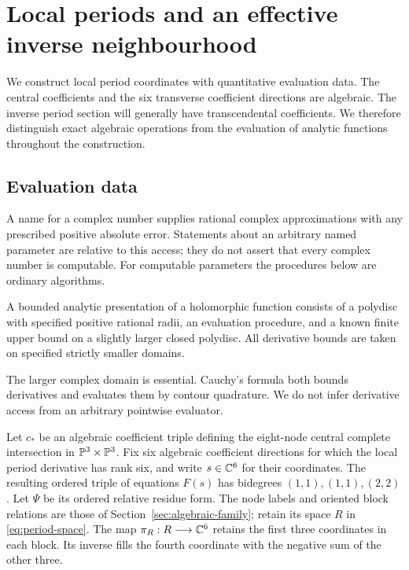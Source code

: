 \section{Local periods and an effective inverse neighbourhood}
\label{sec:local-periods}

We construct local period coordinates with quantitative evaluation data.
The central coefficients and the six transverse coefficient directions
are algebraic. The inverse period section will generally have
transcendental coefficients. We therefore distinguish exact algebraic
operations from the evaluation of analytic functions throughout the
construction.

\subsection{Evaluation data}

A name for a complex number supplies rational complex approximations
with any prescribed positive absolute error. Statements about an
arbitrary named parameter are relative to this access; they do not
assert that every complex number is computable. For computable parameters
the procedures below are ordinary algorithms.

\begin{definition}\label{def:bounded-analytic}
A bounded analytic presentation of a holomorphic function consists of
a polydisc with specified positive rational radii, an evaluation procedure,
and a known finite upper bound on a slightly larger closed polydisc.
All derivative bounds are taken on specified strictly smaller domains.
\end{definition}

The larger complex domain is essential. Cauchy's formula both bounds
derivatives and evaluates them by contour quadrature. We do not infer
derivative access from an arbitrary pointwise evaluator.

Let $c_*$ be an algebraic coefficient triple defining the eight-node
central complete intersection in $\mathbb P^3\times\mathbb P^3$. Fix six algebraic
coefficient directions for which the local period derivative has rank
six, and write $s\in\mathbb C^6$ for their coordinates. The resulting ordered
triple of equations $F(s)$ has bidegrees $(1,1),(1,1),(2,2)$.
Let $\Psi$ be its ordered relative residue form. The node labels and
oriented block relations are those of Section~\ref{sec:algebraic-family};
retain its space $R$ in \eqref{eq:period-space}.
The map $\pi_R:R\longrightarrow\mathbb C^6$ retains the first three
coordinates in each block. Its inverse fills the fourth coordinate
with the negative sum of the other three.

